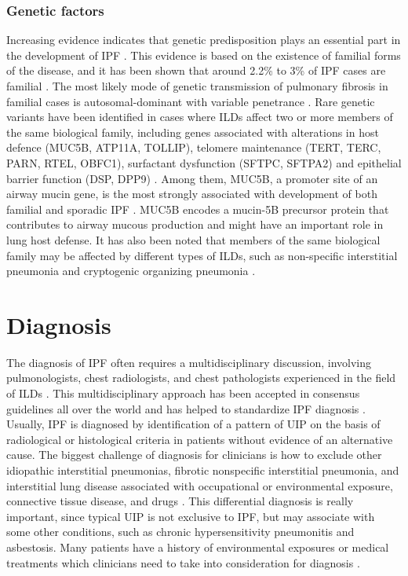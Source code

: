\subsubsection{Genetic factors}
Increasing evidence indicates that genetic predisposition plays an essential part in the development of IPF \citep{xaubet2017idiopathic,richeldi2017idiopathic}. This evidence is based on the existence of familial forms of the disease, and it has been shown that around 2.2\% to 3\% of IPF cases are familial \citep{xaubet2017idiopathic}. The most likely mode of genetic transmission of pulmonary fibrosis in familial cases is autosomal-dominant with variable penetrance \citep{steele2005clinical,allam2006idiopathic,lee2005familial,musk1986genetic}. Rare genetic variants have been identified in cases where ILDs affect two or more members of the same biological family, including genes associated with alterations in host defence (MUC5B, ATP11A, TOLLIP), telomere maintenance (TERT, TERC, PARN, RTEL, OBFC1), surfactant dysfunction (SFTPC, SFTPA2) and epithelial barrier function (DSP, DPP9) \citep{alder2008short,raghu2011official,seibold2011common,xaubet2017idiopathic}. Among them, MUC5B, a promoter site of an airway mucin gene, is the most strongly associated with development of both familial and sporadic IPF \citep{richeldi2017idiopathic}. MUC5B encodes a mucin-5B precursor protein that contributes to airway mucous production and might have an important role in lung host defense. It has also been noted that members of the same biological family may be affected by different types of ILDs, such as non-specific interstitial pneumonia and cryptogenic organizing pneumonia \citep{xaubet2017idiopathic}.

\section{Diagnosis}
The diagnosis of IPF often requires a multidisciplinary discussion, involving pulmonologists, chest radiologists, and chest pathologists experienced in the field of ILDs \citep{flaherty2004idiopathic,king2011idiopathic,raghu2011official}. This multidisciplinary approach has been accepted in consensus guidelines all over the world and has helped to standardize IPF diagnosis \citep{raghu2011official,richeldi2017idiopathic}. Usually, IPF is diagnosed by identification of a pattern of UIP on the basis of radiological or histological criteria in patients without evidence of an alternative cause.  The biggest challenge of diagnosis for clinicians is how to exclude other idiopathic interstitial pneumonias, fibrotic nonspecific interstitial pneumonia, and interstitial lung disease associated with occupational or environmental exposure, connective tissue disease, and drugs \citep{king2011idiopathic,richeldi2017idiopathic}. This differential diagnosis is really important, since typical UIP is not exclusive to IPF, but may associate with some other conditions, such as chronic hypersensitivity pneumonitis and asbestosis. Many patients have a history of environmental exposures or medical treatments which clinicians need to take into consideration for diagnosis \citep{richeldi2017idiopathic}.


